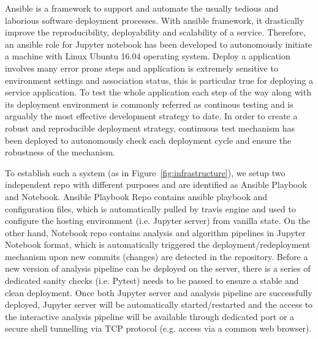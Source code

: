 Ansible\textsuperscript{\textcopyright} is a framework to support and automate the usually tedious and laborious software deployment processes. With ansible framework, it drastically improve the reproducibility, deployability and scalability of a service. Therefore, 
an ansible role for Jupyter notebook has been developed to autonomously initiate a machine with Linux Ubuntu 16.04 operating system. 
Deploy a application involves many error prone steps and application is extremely sensitive to environment settings and association status, this is particular true for deploying a service application. To test the whole application each step of the way along with its deployment environment is commonly referred as continous testing and is arguably the most effective development strategy to date. In order to create a robust and reproducible deployment strategy, continuous test mechanism has been deployed to autonomously check each deployment cycle and ensure the robustness of the mechanism. 

To establish such a system (as in Figure~\ref{fig:infrastructure}), we setup two independent repo with different purposes and are identified as Ansible Playbook and Notebook.  Ansible Playbook Repo contains ansible\textsuperscript{\textcopyright} playbook and configuration files, which is automatically pulled by travis engine and used to configure the hosting environment (i.e. Jupyter\textsuperscript{\textcopyright} server) from vanilla state. On the other hand, Notebook repo contains analysis and algorithm pipelines in Jupyter~\textsuperscript{\textcopyright} Notebook format, which is automatically triggered the deployment/redeployment mechanism upon new commits (changes) are detected in the repository. Before a new version of analysis pipeline can be deployed on the server, there is a series of dedicated sanity checks (i.e. Pytest) needs to be passed to ensure a stable and clean deployment. Once both Jupyter\textsuperscript{\textcopyright} server and analysis pipeline are successfully deployed, Jupyter\textsuperscript{\textcopyright} server will be automatically started/restarted and the access to the interactive analysis pipeline will be available through dedicated port or a secure shell tunnelling via TCP protocol (e.g. access via a common web browser). 